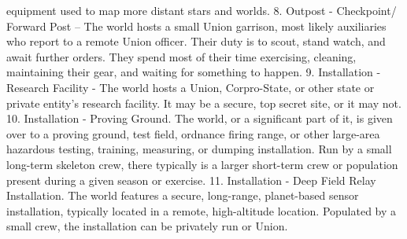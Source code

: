         equipment used to map more distant stars and worlds.   
    8.  Outpost - Checkpoint/ Forward Post -- The world hosts a small Union garrison, most likely  
        auxiliaries who report to a remote Union officer. Their duty is to scout, stand watch, and  
        await further orders. They spend most of their time exercising, cleaning, maintaining their  
        gear, and waiting for something to happen.   
    9.  Installation - Research Facility - The world hosts a Union, Corpro-State, or other state or  
        private entity’s research facility. It may be a secure, top secret site, or it may not.   
    10. Installation - Proving Ground. The world, or a significant part of it, is given over to a  
        proving ground, test field, ordnance firing range, or other large-area hazardous testing,  
        training, measuring, or dumping installation. Run by a small long-term skeleton crew, there  
        typically is a larger short-term crew or population present during a given season or  
        exercise.   
    11. Installation - Deep Field Relay Installation. The world features a secure, long-range,  
        planet-based sensor installation, typically located in a remote, high-altitude location.  
        Populated by a small crew, the installation can be privately run or Union.   

                                                                                                          


